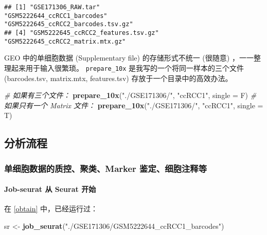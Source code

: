 \documentclass[
]{article}
\newenvironment{Shaded}{\begin{snugshade}}{\end{snugshade}}
\newcommand{\CommentTok}[1]{\textcolor[rgb]{0.56,0.35,0.01}{\textit{#1}}}
\newcommand{\DataTypeTok}[1]{\textcolor[rgb]{0.13,0.29,0.53}{#1}}
\newcommand{\KeywordTok}[1]{\textcolor[rgb]{0.13,0.29,0.53}{\textbf{#1}}}
\newcommand{\NormalTok}[1]{#1}
\newcommand{\StringTok}[1]{\textcolor[rgb]{0.31,0.60,0.02}{#1}}
\begin{document}
\begin{verbatim}
## [1] "GSE171306_RAW.tar"                 "GSM5222644_ccRCC1_barcodes"        "GSM5222645_ccRCC2_barcodes.tsv.gz"
## [4] "GSM5222645_ccRCC2_features.tsv.gz" "GSM5222645_ccRCC2_matrix.mtx.gz"
\end{verbatim}

GEO 中的单细胞数据 (Supplementary file) 的存储形式不统一 (很随意) ，一一整理起来用于输入很繁琐。
\texttt{prepare\_10x} 是我写的一个将同一样本的三个文件 (barcodes.tsv, matrix.mtx, features.tsv) 存放于一个目录中的高效办法。

\begin{Shaded}
\begin{Highlighting}[]
\CommentTok{\# 如果有三个文件：}
\KeywordTok{prepare\_10x}\NormalTok{(}\StringTok{"./GSE171306/"}\NormalTok{, }\StringTok{"ccRCC1"}\NormalTok{, }\DataTypeTok{single =}\NormalTok{ F)}
\CommentTok{\# 如果只有一个 Matrix 文件：}
\KeywordTok{prepare\_10x}\NormalTok{(}\StringTok{"./GSE171306/"}\NormalTok{, }\StringTok{"ccRCC1"}\NormalTok{, }\DataTypeTok{single =}\NormalTok{ T)}
\end{Highlighting}
\end{Shaded}

\hypertarget{ux5206ux6790ux6d41ux7a0b}{%
\subsection{分析流程}\label{ux5206ux6790ux6d41ux7a0b}}

\hypertarget{ux5355ux7ec6ux80deux6570ux636eux7684ux8d28ux63a7ux805aux7c7bmarker-ux9274ux5b9aux7ec6ux80deux6ce8ux91caux7b49}{%
\subsubsection{单细胞数据的质控、聚类、Marker 鉴定、细胞注释等}\label{ux5355ux7ec6ux80deux6570ux636eux7684ux8d28ux63a7ux805aux7c7bmarker-ux9274ux5b9aux7ec6ux80deux6ce8ux91caux7b49}}

\hypertarget{job-seurat-ux4ece-seurat-ux5f00ux59cb}{%
\paragraph{Job-seurat 从 Seurat 开始}\label{job-seurat-ux4ece-seurat-ux5f00ux59cb}}

在 \ref{obtain} 中，已经运行过：

\begin{Shaded}
\begin{Highlighting}[]
\NormalTok{sr \textless{}{-}}\StringTok{ }\KeywordTok{job\_seurat}\NormalTok{(}\StringTok{"./GSE171306/GSM5222644\_ccRCC1\_barcodes"}\NormalTok{)}
\end{Highlighting}
\end{Shaded}
\end{document}
